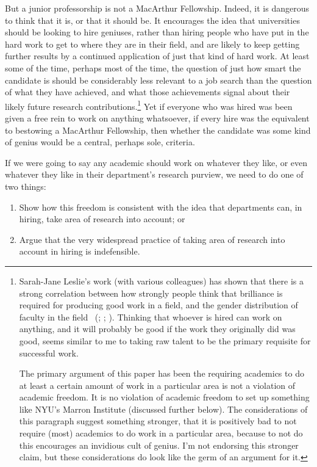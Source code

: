 \documentclass[
  11pt,
  letterpaper,
  DIV=11,
  numbers=noendperiod,
  twoside]{scrartcl}
\providecommand{\tightlist}{%
  \setlength{\itemsep}{0pt}\setlength{\parskip}{0pt}}
\begin{document}
But a junior professorship is not a MacArthur Fellowship. Indeed, it is
dangerous to think that it is, or that it should be. It encourages the
idea that universities should be looking to hire geniuses, rather than
hiring people who have put in the hard work to get to where they are in
their field, and are likely to keep getting further results by a
continued application of just that kind of hard work. At least some of
the time, perhaps most of the time, the question of just how smart the
candidate is should be considerably less relevant to a job search than
the question of what they have achieved, and what those achievements
signal about their likely future research contributions.\footnote{Sarah-Jane
  Leslie's work (with various colleagues) has shown that there is a
  strong correlation between how strongly people think that brilliance
  is required for producing good work in a field, and the gender
  distribution of faculty in the field
  ~(;
  ;
  ). Thinking that
  whoever is hired can work on anything, and it will probably be good if
  the work they originally did was good, seems similar to me to taking
  raw talent to be the primary requisite for successful work.

  The primary argument of this paper has been the requiring academics to
  do at least a certain amount of work in a particular area is not a
  violation of academic freedom. It is no violation of academic freedom
  to set up something like NYU's Marron Institute (discussed further
  below). The considerations of this paragraph suggest something
  stronger, that it is positively bad to not require (most) academics to
  do work in a particular area, because to not do this encourages an
  invidious cult of genius. I'm not endorsing this stronger claim, but
  these considerations do look like the germ of an argument for it.} Yet
if everyone who was hired was been given a free rein to work on anything
whatsoever, if every hire was the equivalent to bestowing a MacArthur
Fellowship, then whether the candidate was some kind of genius would be
a central, perhaps sole, criteria.

If we were going to say any academic should work on whatever they like,
or even whatever they like in their department's research purview, we
need to do one of two things:

\begin{enumerate}
\def\labelenumi{\arabic{enumi}.}
\tightlist
\item
  Show how this freedom is consistent with the idea that departments
  can, in hiring, take area of research into account; or
\item
  Argue that the very widespread practice of taking area of research
  into account in hiring is indefensible.
\end{enumerate}
\end{document}
